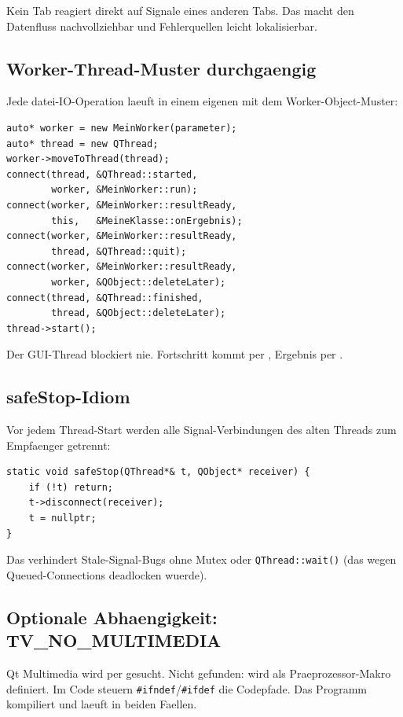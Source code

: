 Kein Tab reagiert direkt auf Signale eines anderen Tabs.
Das macht den Datenfluss nachvollziehbar und
Fehlerquellen leicht lokalisierbar.

\subsection{Worker-Thread-Muster durchgaengig}

Jede datei-IO-Operation laeuft in einem eigenen
 mit dem Worker-Object-Muster:

\begin{lstlisting}
auto* worker = new MeinWorker(parameter);
auto* thread = new QThread;
worker->moveToThread(thread);
connect(thread, &QThread::started,
        worker, &MeinWorker::run);
connect(worker, &MeinWorker::resultReady,
        this,   &MeineKlasse::onErgebnis);
connect(worker, &MeinWorker::resultReady,
        thread, &QThread::quit);
connect(worker, &MeinWorker::resultReady,
        worker, &QObject::deleteLater);
connect(thread, &QThread::finished,
        thread, &QObject::deleteLater);
thread->start();
\end{lstlisting}

Der GUI-Thread blockiert nie. Fortschritt kommt per
, Ergebnis per
.

\subsection{safeStop-Idiom}

Vor jedem Thread-Start werden alle Signal-Verbindungen
des alten Threads zum Empfaenger getrennt:

\begin{lstlisting}
static void safeStop(QThread*& t, QObject* receiver) {
    if (!t) return;
    t->disconnect(receiver);
    t = nullptr;
}
\end{lstlisting}

Das verhindert Stale-Signal-Bugs ohne Mutex oder
\verb|QThread::wait()| (das wegen Queued-Connections
deadlocken wuerde).

\subsection{Optionale Abhaengigkeit: TV\_NO\_MULTIMEDIA}

Qt Multimedia wird per 
gesucht. Nicht gefunden: 
wird als Praeprozessor-Makro definiert. Im Code
steuern \verb|#ifndef|/\verb|#ifdef| die Codepfade.
Das Programm kompiliert und laeuft in beiden Faellen.

